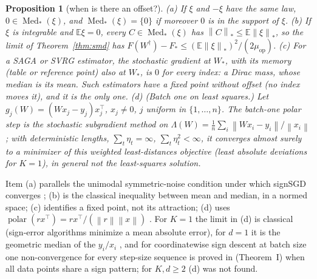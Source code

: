 \documentclass[10pt]{article}
\newtheorem{proposition}[theorem]{Proposition}
\newcommand{\E}{\mathbb{E}}
\newcommand{\norm}[1]{\left\|#1\right\|}
\newcommand{\nnuc}[1]{\left\|#1\right\|_{*}}
\newcommand{\polar}{\operatorname{polar}}
\newcommand{\Med}{\operatorname{Med}_\ast}
\newcommand{\muop}{\mu_{\mathrm{op}}}
\begin{document}
\begin{proposition}[when is there an offset?]\label{prop:comp}
(a) If $\xi$ and $-\xi$ have the same law, $0\in\Med(\xi)$, and $\Med(\xi)=\{0\}$ if moreover $0$ is in the support
of $\xi$.
(b) If $\xi$ is integrable and $\E\xi=0$, every $C\in\Med(\xi)$ has $\nnuc C\le\E\nnuc\xi$, so the limit of
Theorem~\ref{thm:smd} has $F(W^\dagger)-F_\ast\le(\E\nnuc\xi)^2/(2\muop)$.
(c) For a SAGA or SVRG estimator, the stochastic gradient at $W_\ast$, with its memory (table or reference point) also
at $W_\ast$, is $0$ for every index: a Dirac mass, whose median is its mean. Such estimators have a fixed point
without offset (no index moves it), and it is the only one.
(d) (Batch one on least squares.) Let $g_j(W)=(Wx_j-y_j)x_j^\top$, $x_j\ne0$, $j$ uniform in $\{1,\dots,n\}$. The
batch-one polar step is the stochastic subgradient method on $\Lambda(W)=\frac1n\sum_i\norm{Wx_i-y_i}/\norm{x_i}$;
with deterministic lengths, $\sum_t\eta_t=\infty$, $\sum_t\eta_t^2<\infty$, it converges almost surely to a minimizer
of this weighted
least-distances objective (least absolute deviations for $K=1$), in general not the least-squares solution.
\end{proposition}
Item (a) parallels the unimodal symmetric-noise condition under which signSGD converges
\cite{bernstein2019majority}; (b) is the classical inequality between mean and median, in a normed space; (c)
identifies a fixed point, not its attraction; (d) uses $\polar(rx^\top)=rx^\top/(\norm r\norm x)$
\cite[Lemma~H.1]{li2026implicit}. For $K=1$ the limit in (d) is classical (sign-error algorithms minimize a mean
absolute error), for $d=1$ it is the geometric median of the $y_i/x_i$ \cite{cardot2013efficient}, and for
coordinatewise sign descent at batch size one non-convergence for every step-size sequence is
proved in \cite{karimireddy2019error} (Theorem~I) when all data points share a sign pattern; for $K,d\ge2$ (d) was not
found.
\end{document}
